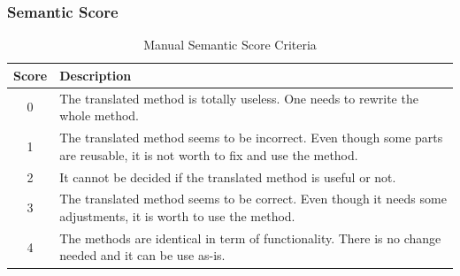 \subsubsection{\textbf{Semantic Score}}
\begin{table}
\caption{Manual Semantic Score Criteria}
\begin{tabular}{|c|p{6.5cm}|}
\hline
Score & Description \\
\hline
0 & The translated method is totally useless. One needs to rewrite the whole method. \\
\hline
1 & The translated method seems to be incorrect. Even though some parts are reusable, it is not worth to fix and use the method. \\
\hline
2 &  It cannot be decided if the translated method is useful or not. \\
\hline
3 & The translated method seems to be correct. Even though it needs some adjustments, it is worth to use the method. \\
\hline
4 & The methods are identical in term of functionality. There is no change needed and it can be use as-is. \\
\hline
\end{tabular}
\label{table:criteria}
\end{table}



